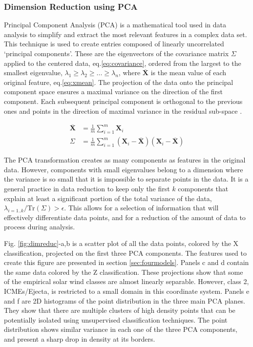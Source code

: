 \subsubsection{Dimension Reduction using PCA}
Principal Component Analysis (PCA) is a mathematical tool used in data analysis to simplify and extract the most relevant features in a complex data set. This technique is used to create entries composed of linearly uncorrelated `principal components'. These are the eigenvectors of the covariance matrix $\Sigma$ applied to the centered data, eq.\eqref{eq:covariance}, ordered from the largest to the smallest eigenvalue, $\lambda_1 \ge \lambda_2 \ge ... \ge \lambda_n$, where $\overline{\boldsymbol{X}}$ is the mean value of each original feature, eq.\eqref{eq:xmean}. The projection of the data onto the principal component space ensures a maximal variance on the direction of the first component. Each subsequent principal component is orthogonal to the previous ones and points in the direction of maximal variance in the residual sub-space \citep{Shlens2014}.

\begin{align}
\overline{\boldsymbol{X}} & = \frac{1}{m} \sum_{i=1}^{m} \boldsymbol{X}_i \label{eq:xmean} \\
\Sigma & = \frac{1}{m} \sum_{i=1}^{m} \left( \boldsymbol{X}_i - \overline{\boldsymbol{X}} \right)\left( \boldsymbol{X}_i - \overline{\boldsymbol{X}} \right) \label{eq:covariance}
\end{align}

The PCA transformation creates as many components as features in the original data. However, components with small eigenvalues belong to a dimension where the variance is so small that it is impossible to separate points in the data. It is a general practice in data reduction to keep only the first $k$ components that explain at least a significant portion of the total variance of the data, $\lambda_{i=1..k}/\text{Tr}(\Sigma) > \epsilon$. This allows for a selection of information that will effectively differentiate data points, and for a reduction of the amount of data to process during analysis.

Fig. \ref{fig:dimreduc}-a,b is a scatter plot of all the data points, colored by the X classification, projected on the first three PCA components. The features used to create this figure are presented in section \ref{sec:fourmodels}. Panels c and d contain the same data colored by the Z classification. These projections show that some of the empirical solar wind classes are almost linearly separable. However, class 2, ICMEs/Ejecta, is restricted to a small domain in this coordinate system. Panels e and f are 2D histograms of the point distribution in the three main PCA planes. They show that there are multiple clusters of high density points that can be potentially isolated using unsupervised classification techniques. The point distribution shows similar variance in each one of the three PCA components, and present a sharp drop in density at its borders.


